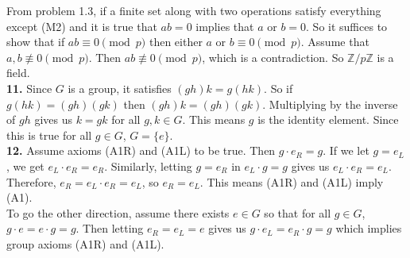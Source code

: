 \documentclass{article}
\newcommand{\ZZ}{\mathbb{Z}}
\begin{document}
From problem 1.3, if a finite set along with two operations satisfy everything except (M2) and it is true that $ab = 0$ implies that $a$ or $b = 0$. So it suffices to show that if $ab \equiv 0 \pmod{p}$ then either $a$ or $b \equiv 0 \pmod{p}$. Assume that $a, b \not \equiv 0 \pmod{p}$. Then $ab \not \equiv 0 \pmod{p}$, which is a contradiction. So $\ZZ/p\ZZ$ is a field. \\

\textbf{11.} Since $G$ is a group, it satisfies $(gh)k = g(hk)$. So if $g(hk) = (gh)(gk)$ then $(gh)k = (gh)(gk)$. Multiplying by the inverse of $gh$ gives us $k = gk$ for all $g, k \in G$. This means $g$ is the identity element. Since this is true for all $g \in G$, $G = \{e\}$. \\

\textbf{12.} Assume axioms (A1R) and (A1L) to be true. Then $g\cdot e_R = g$. If we let $g = e_L$, we get $e_L\cdot e_R = e_R$. Similarly, letting $g = e_R$ in $e_L\cdot g = g$ gives us $e_L\cdot e_R = e_L$. Therefore, $e_R = e_L\cdot e_R = e_L$, so $e_R = e_L$. This means (A1R) and (A1L) imply (A1). \\

To go the other direction, assume there exists $e \in G$ so that for all $g \in G$, $g\cdot e = e\cdot g = g$. Then letting $e_R = e_L = e$ gives us $g\cdot e_L = e_R\cdot g = g$ which implies group axioms (A1R) and (A1L).
\end{document}
